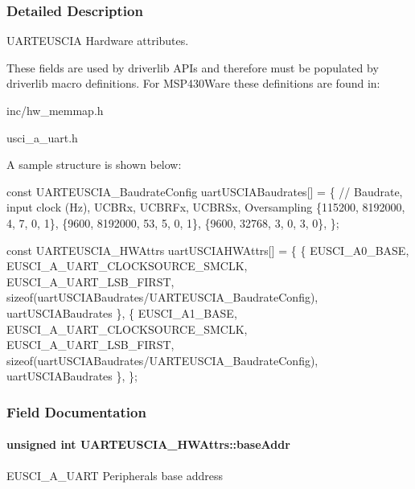 \subsubsection{Detailed Description}
U\+A\+R\+T\+E\+U\+S\+C\+I\+A Hardware attributes. 

These fields are used by driverlib A\+P\+Is and therefore must be populated by driverlib macro definitions. For M\+S\+P430\+Ware these definitions are found in\+:
\begin{DoxyItemize}
\item inc/hw\+\_\+memmap.\+h
\item usci\+\_\+a\+\_\+uart.\+h
\end{DoxyItemize}

A sample structure is shown below\+: 
\begin{DoxyCode}
\textcolor{keyword}{const} UARTEUSCIA_BaudrateConfig uartUSCIABaudrates[] = \{
 \textcolor{comment}{// Baudrate, input clock (Hz), UCBRx, UCBRFx, UCBRSx, Oversampling}
    \{115200,  8192000,          4,     7,      0,      1\},
    \{9600,    8192000,          53,    5,      0,      1\},
    \{9600,    32768,            3,     0,      3,      0\},
\};

\textcolor{keyword}{const} UARTEUSCIA_HWAttrs uartUSCIAHWAttrs[] = \{
    \{
        EUSCI\_A0\_BASE,
        EUSCI\_A\_UART\_CLOCKSOURCE\_SMCLK,
        EUSCI\_A\_UART\_LSB\_FIRST,
        \textcolor{keyword}{sizeof}(uartUSCIABaudrates/UARTEUSCIA_BaudrateConfig),
        uartUSCIABaudrates
    \},
    \{
        EUSCI\_A1\_BASE,
        EUSCI\_A\_UART\_CLOCKSOURCE\_SMCLK,
        EUSCI\_A\_UART\_LSB\_FIRST,
        \textcolor{keyword}{sizeof}(uartUSCIABaudrates/UARTEUSCIA_BaudrateConfig),
        uartUSCIABaudrates
    \},
\};
\end{DoxyCode}
 

\subsubsection{Field Documentation}
\paragraph[{base\+Addr}]{\setlength{\rightskip}{0pt plus 5cm}unsigned int U\+A\+R\+T\+E\+U\+S\+C\+I\+A\+\_\+\+H\+W\+Attrs\+::base\+Addr}\label{struct_u_a_r_t_e_u_s_c_i_a___h_w_attrs_afa40bb7e1a85f9e20565a690ed9b86cc}
E\+U\+S\+C\+I\+\_\+\+A\+\_\+\+U\+A\+R\+T Peripheral\textquotesingle{}s base address 

